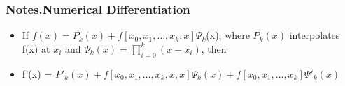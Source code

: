 \documentclass[12pt,letterpaper]{article}
\newcommand\asgnname{Notes}         %
\newenvironment{answer}[1]{
  \subsubsection*{%
  \asgnname.#1}
}{\newpage}
\begin{document}
\begin{answer}{Numerical Differentiation}
\begin{itemize}
    \item If $f(x) = P_k(x) + f[ x_0, x_1, \ldots, x_k, x ]\Psi_k$(x), where $P_k(x)$ interpolates f(x) at $x_i$ and $\Psi_k(x) = \prod_{i=0}^k(x-x_i)$, then
    \item f'(x) = $P'_k(x) + f[ x_0, x_1, \ldots, x_k, x, x]\Psi_k(x) + f[ x_0, x_1, \ldots, x_k ]\Psi '_k(x)$
\end{itemize}
\end{answer}
\end{document}
